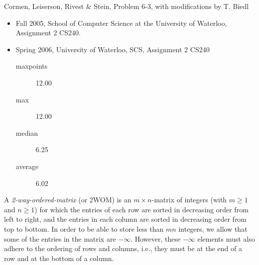 \begin{authorship}
Cormen, Leiserson, Rivest \& Stein, Problem 6-3, with modifications by T. Biedl
\end{authorship}
\begin{usage}
\begin{itemize}
\item Fall 2005, School of Computer Science at the University of Waterloo, Assignment 2 CS240.
\item Spring 2006, University of Waterloo, SCS, Assignment 2 CS240
\begin{description}
\item[maxpoints] 12.00
\item[max] 12.00
\item[median] 6.25
\item[average] 6.02
\end{description}


\end{itemize}
\end{usage}
A {\em 2-way-ordered-matrix} (or 2WOM) is an
$m\times n$-matrix of integers (with $m\geq 1$
and $n\geq 1$) for which the entries of each row are sorted in decreasing
order from left to right, and the entries in each column are sorted in
decreasing order from top to bottom.  In order to be able to store less
than $mn$ integers, we allow that some of the entries in the matrix are
$-\infty$.  However, these $-\infty$ elements must also adhere to the ordering
of rows and columns, i.e., they must be at the end of a row and at the
bottom of a column.

